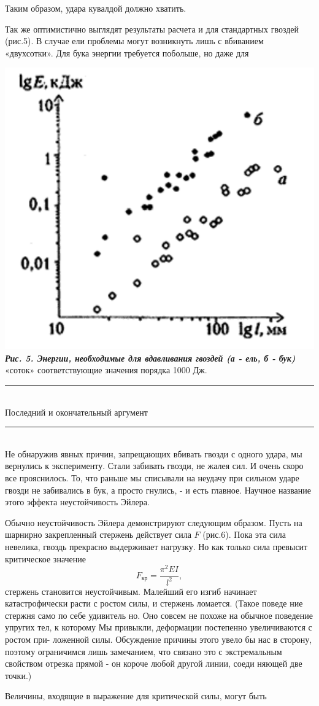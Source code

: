 \begin{multicols}{3}
Таким образом, удара кувалдой должно хватить.

Так же оптимистично выглядят результаты расчета и для стандартных гвоздей (рис.5). В случае ели проблемы могут возникнуть лишь с вбиванием «двухсотки». Для бука энергии требуется побольше, но даже для



\includegraphics[width=1\linewidth]{imageg} 
{\textbf{\textit{Рис. 5. Энергии, необходимые для вдавливания гвоздей (а - ель, б - бук)}}}
\vspace{10pt}\\
«соток» соответствующие значения порядка 1000 Дж.
\vspace{2pt}
\noindent\rule{1\linewidth}{1pt} \\
\textsf{{\Large{Последний и окончательный аргумент}}} 
\vskip -7pt
\noindent\rule{1\linewidth}{1pt} \\
Не обнаружив явных причин, запрещающих вбивать гвозди с одного удара, мы вернулись к эксперименту. Стали забивать гвозди, не жалея сил. И очень скоро все прояснилось. То, что раньше мы списывали на неудачу при сильном ударе гвозди не забивались в бук, а просто гнулись, - и есть главное. Научное название этого эффекта неустойчивость Эйлера. 

Обычно неустойчивость Эйлера демонстрируют следующим образом. Пусть на шарнирно закрепленный стержень действует сила $F$ (рис.6). Пока эта сила невелика, гвоздь прекрасно выдерживает нагрузку. Но как только сила превысит критическое значение
$$F_{\text{кр}} = \frac{\pi^2EI}{l^2},$$
стержень становится неустойчивым. Малейший его изгиб начинает катастрофически расти с ростом силы, и стержень ломается. (Такое поведе ние стержня само по себе удивитель но. Оно совсем не похоже на обычное поведение упругих тел, к которому Мы привыкли, деформации постепенно увеличиваются с ростом при- ложенной силы. Обсуждение причины этого увело бы нас в сторону, поэтому ограничимся лишь замечанием, что связано это с экстремальным свойством отрезка прямой - он короче любой другой линии, соеди няющей две точки.)

Величины, входящие в выражение для критической силы, могут быть

\end{multicols}

